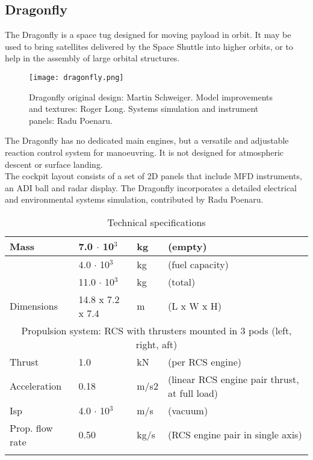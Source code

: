 \documentclass[Orbiter User Manual.tex]{subfiles}
\begin{document}
\subsection{Dragonfly}
The Dragonfly is a space tug designed for moving payload in orbit. It may be used to bring satellites delivered by the Space Shuttle into higher orbits, or to help in the assembly of large orbital structures.

\begin{figure}[H]
  \centering
  \texttt{[image: dragonfly.png]}
  \caption{Dragonfly original design: Martin Schweiger. Model improvements and textures: Roger Long. Systems simulation and instrument panels: Radu Poenaru.}
\end{figure}

\noindent
The Dragonfly has no dedicated main engines, but a versatile and adjustable reaction control system for manoeuvring. It is not designed for atmospheric descent or surface landing.\\
The cockpit layout consists of a set of 2D panels that include MFD instruments, an ADI ball and radar display. The Dragonfly incorporates a detailed electrical and environmental systems simulation, contributed by Radu Poenaru.

	\begin{longtable}{ |p{}|p{}|p{}|p{}| }
	\hline\rule{0pt}{2ex}
	Mass & 7.0 $\cdot$ 10$^{3}$ & kg & (empty)\\
	\hline\rule{0pt}{2ex}
	& 4.0 $\cdot$ 10$^{3}$ & kg & (fuel capacity)\\
	\hline\rule{0pt}{2ex}
	& 11.0 $\cdot$ 10$^{3}$ & kg & (total)\\
	\hline\rule{0pt}{2ex}
	Dimensions & 14.8 x 7.2 x 7.4 & m & (L x W x H)\\
	\hline
	\multicolumn{4}{|c|}{\rule{0pt}{2ex}Propulsion system: RCS with thrusters mounted in 3 pods (left, right, aft)}\\
	\hline\rule{0pt}{2ex}
	Thrust & 1.0 & kN & (per RCS engine)\\
	\hline\rule{0pt}{2ex}
	Acceleration & 0.18 & m/s2 & (linear RCS engine pair thrust, at full load)\\
	\hline\rule{0pt}{2ex}
	Isp & 4.0 $\cdot$ 10$^{3}$ & m/s & (vacuum)\\
	\hline\rule{0pt}{2ex}
	Prop. flow rate & 0.50 & kg/s & (RCS engine pair in single axis)\\
	\hline
	\caption{Technical specifications}
	\end{longtable}
\end{document}
